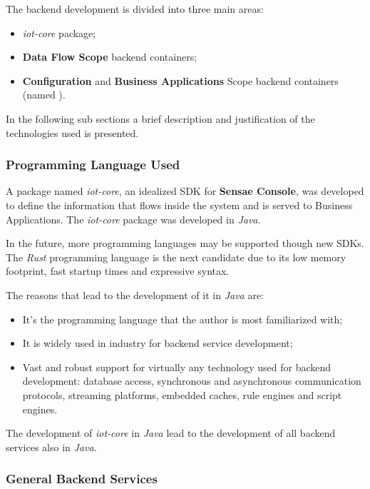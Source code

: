 The backend development is divided into three main areas:

\begin{itemize}
    \item \textit{iot-core} package;
    \item \textbf{Data Flow Scope} backend containers;
    \item \textbf{Configuration} and \textbf{Business Applications} Scope backend containers (named ).
\end{itemize}

In the following sub sections a brief description and justification of the technologies used is presented.

\subsubsection{Programming Language Used}
\label{subsubsec:implementation:decisions:backend:prog}

A package named \textit{iot-core}, an idealized \gls{SDK} for \textbf{Sensae Console}, was developed to define the information that flows inside the system and is served to Business Applications.
The \textit{iot-core} package was developed in \textit{Java}.

In the future, more programming languages may be supported though new \gls{SDK}s. The \textit{Rust} programming language is the next candidate due to its low memory footprint, fast startup times and expressive syntax.

The reasons that lead to the development of it in \textit{Java} are:

\begin{itemize}
    \item It's the programming language that the author is most familiarized with;
    \item It is widely used in industry for backend service development;
    \item Vast and robust support for virtually any technology used for backend development: database access, synchronous and asynchronous communication protocols, streaming platforms, embedded caches, rule engines and script engines.
\end{itemize}

The development of \textit{iot-core} in \textit{Java} lead to the development of all backend services also in \textit{Java}.

\subsubsection{General Backend Services}
\label{subsubsec:implementation:decisions:backend:geral}

